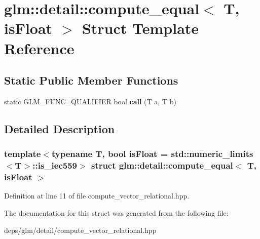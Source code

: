 \hypertarget{structglm_1_1detail_1_1compute__equal}{}\section{glm\+:\+:detail\+:\+:compute\+\_\+equal$<$ T, is\+Float $>$ Struct Template Reference}
\label{structglm_1_1detail_1_1compute__equal}
\subsection*{Static Public Member Functions}
\begin{DoxyCompactItemize}
\item 
\mbox{\label{structglm_1_1detail_1_1compute__equal_a310cadc43da05a6db94c9befbdf34005}} 
static G\+L\+M\+\_\+\+F\+U\+N\+C\+\_\+\+Q\+U\+A\+L\+I\+F\+I\+ER bool {\bfseries call} (T a, T b)
\end{DoxyCompactItemize}


\subsection{Detailed Description}
\subsubsection*{template$<$typename T, bool is\+Float = std\+::numeric\+\_\+limits$<$\+T$>$\+::is\+\_\+iec559$>$\newline
struct glm\+::detail\+::compute\+\_\+equal$<$ T, is\+Float $>$}



Definition at line 11 of file compute\+\_\+vector\+\_\+relational.\+hpp.



The documentation for this struct was generated from the following file\+:\begin{DoxyCompactItemize}
\item 
deps/glm/detail/compute\+\_\+vector\+\_\+relational.\+hpp\end{DoxyCompactItemize}
